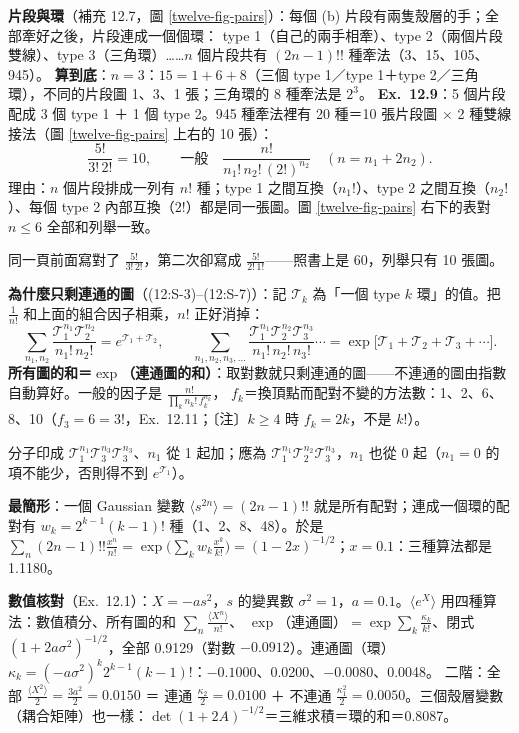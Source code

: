 \textbf{片段與環}（補充 12.7，圖 \ref{twelve-fig-pairs}）：每個 (b) 片段有兩隻殼層的手；全部牽好之後，片段連成一個個環：
type 1（自己的兩手相牽）、type 2（兩個片段雙線）、type 3（三角環）……$n$ 個片段共有 $(2n-1)!!$ 種牽法（3、15、105、945）。
\textbf{算到底}：$n=3$：$15=1+6+8$（三個 type 1／type 1＋type 2／三角環），不同的片段圖 1、3、1 張；三角環的 8 種牽法是 $2^3$。
\textbf{Ex.~12.9}：5 個片段配成 3 個 type 1 ＋ 1 個 type 2。945 種牽法裡有 20 種＝10 張片段圖 $\times$ 2 種雙線接法（圖 \ref{twelve-fig-pairs} 上右的 10 張）：
\[\frac{5!}{3!\,2!}=10,\qquad\text{一般}\quad\frac{n!}{n_1!\,n_2!\,(2!)^{n_2}}\quad(n=n_1+2n_2).\tag{12:S-4}\]
理由：$n$ 個片段排成一列有 $n!$ 種；type 1 之間互換（$n_1!$）、type 2 之間互換（$n_2!$）、每個 type 2 內部互換（$2!$）都是同一張圖。圖 \ref{twelve-fig-pairs} 右下的表對 $n\le6$ 全部和列舉一致。
\begin{errbox}[p.~320]
同一頁前面寫對了 $\frac{5!}{3!\,2!}$，第二次卻寫成 $\frac{5!}{2!\,1!}$——照書上是 60，列舉只有 10 張圖。
\end{errbox}

\textbf{為什麼只剩連通的圖}（(12:S-3)--(12:S-7)）：記 $\mathcal T_k$ 為「一個 type $k$ 環」的值。把 $\frac1{n!}$ 和上面的組合因子相乘，$n!$ 正好消掉：
\[\sum_{n_1,n_2}\frac{\mathcal T_1^{n_1}\mathcal T_2^{n_2}}{n_1!\,n_2!}=e^{\mathcal T_1+\mathcal T_2},\qquad
\sum_{n_1,n_2,n_3,\ldots}\frac{\mathcal T_1^{n_1}\mathcal T_2^{n_2}\mathcal T_3^{n_3}}{n_1!\,n_2!\,n_3!}\cdots=\exp\big[\mathcal T_1+\mathcal T_2+\mathcal T_3+\cdots\big].\tag{12:S-5--12:S-7}\]
\textbf{所有圖的和＝$\exp$（連通圖的和）}：取對數就只剩連通的圖——不連通的圖由指數自動算好。一般的因子是 $\frac{n!}{\prod_kn_k!\,f_k^{n_k}}$，
$f_k$＝換頂點而配對不變的方法數：1、2、6、8、10（$f_3=6=3!$，Ex.~12.11；〔注〕$k\ge4$ 時 $f_k=2k$，不是 $k!$）。
\begin{errbox}[p.~322，(12:S-7)]
分子印成 $\mathcal T_1^{n_1}\mathcal T_3^{n_3}\mathcal T_3^{n_3}$、$n_1$ 從 1 起加；應為 $\mathcal T_1^{n_1}\mathcal T_2^{n_2}\mathcal T_3^{n_3}$，$n_1$ 也從 0 起（$n_1=0$ 的項不能少，否則得不到 $e^{\mathcal T_1}$）。
\end{errbox}
\textbf{最簡形}：一個 Gaussian 變數 $\langle s^{2n}\rangle=(2n-1)!!$ 就是所有配對；連成一個環的配對有 $w_k=2^{k-1}(k-1)!$ 種（1、2、8、48）。於是
$\sum_n(2n-1)!!\frac{x^n}{n!}=\exp\big(\sum_kw_k\frac{x^k}{k!}\big)=(1-2x)^{-1/2}$；$x=0.1$：三種算法都是 1.1180。

\textbf{數值核對}（Ex.~12.1）：$X=-as^2$，$s$ 的變異數 $\sigma^2=1$，$a=0.1$。$\langle e^X\rangle$ 用四種算法：數值積分、所有圖的和 $\sum_n\frac{\langle X^n\rangle}{n!}$、
$\exp$（連通圖）$=\exp\sum_k\frac{\kappa_k}{k!}$、閉式 $(1+2a\sigma^2)^{-1/2}$，全部 0.9129（對數 $-0.0912$）。連通圖（環）$\kappa_k=(-a\sigma^2)^k2^{k-1}(k-1)!$：$-0.1000$、0.0200、$-0.0080$、0.0048。
二階：全部 $\frac{\langle X^2\rangle}2=\frac{3a^2}2=0.0150$ ＝ 連通 $\frac{\kappa_2}2=0.0100$ ＋ 不連通 $\frac{\kappa_1^2}2=0.0050$。三個殼層變數（耦合矩陣）也一樣：$\det(1+2A)^{-1/2}$＝三維求積＝環的和＝0.8087。

